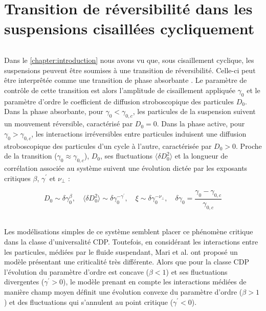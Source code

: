 \chapter{Transition de réversibilité dans les suspensions cisaillées cycliquement}

\label{chapter:Susp}

\subparagraph{}Dans le \autoref{chapter:introduction} nous avons vu que, sous cisaillement cyclique, les suspensions peuvent être soumises à une transition de réversibilité. Celle-ci peut être interprêtée comme une transition de phase absorbante \cite{pine_chaos_2005, corte_random_2008, tjhung_criticality_2016, ge_rheology_2022}. Le paramètre de contrôle de cette transition est alors l'amplitude de cisaillement appliquée $\gamma_0$ et le paramètre d'ordre le coefficient de diffusion stroboscopique des particules $D_0$. Dans la phase absorbante, pour $\gamma_0 < \gamma_{0,c}$, les particules de la suspension suivent un mouvement réversible, caractérisé par $D_0 = 0$. Dans la phase active, pour $\gamma_0 > \gamma_{0,c}$, les interactions irréversibles entre particules induisent une diffusion stroboscopique des particules d'un cycle à l'autre, caractérisée par $D_0 >0$. Proche de la transition ($\gamma_0\approx\gamma_{0,c}$), $D_0$, ses fluctuations $\langle \delta D_0^2 \rangle$ et la longueur de corrélation associée au système suivent une évolution dictée par les exposants critiques $\beta$, $\gamma^\prime$ et $\nu_\perp$ : 

\begin{equation}
	D_0 \sim \delta\gamma_0^\beta, \quad \langle \delta D_0^2 \rangle \sim \delta\gamma_0^{-\gamma^\prime},\quad \xi \sim \delta\gamma_0^{-\nu_\perp}, \quad \delta\gamma_0 = \frac{\gamma_0-\gamma_{0,c}}{\gamma_{0,c}}
\end{equation}

\subparagraph{}Les modélisations simples de ce système \cite{corte_random_2008, tjhung_criticality_2016, ge_rheology_2022} semblent placer ce phénomène critique dans la classe d'universalité CDP. Toutefois, en considérant les interactions entre les particules, médiées par le fluide suspendant, Mari et al. \cite{mari_absorbing_2022} ont proposé un modèle présentant une criticalité très différente. Alors que pour la classe CDP l'évolution du paramètre d'ordre est concave ($\beta < 1$) et ses fluctuations divergentes ($\gamma^\prime>0$), le modèle prenant en compte les interactions médiées de manière champ moyen définit une évolution convexe du paramètre d'ordre ($\beta >1$) et des fluctuations qui s'annulent au point critique ($\gamma^\prime < 0$).

